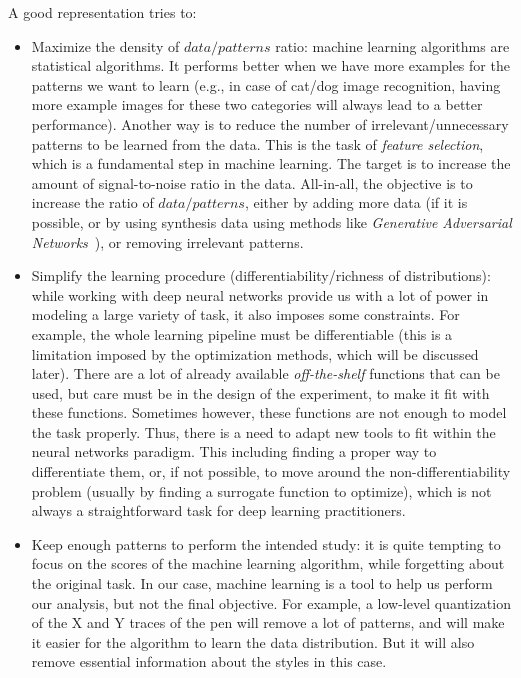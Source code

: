   A good representation tries to:
  \begin{itemize}[noitemsep]
      \item Maximize the density of $data/patterns$ ratio: machine learning algorithms are statistical algorithms. It performs better when we have more examples for the patterns we want to learn (e.g., in case of cat/dog image recognition, having more example images for these two categories will always lead to a better performance).
      Another way is to reduce the number of irrelevant/unnecessary patterns to be learned from the data. This is the task of \textit{feature selection}, which is a fundamental step in machine learning. The target is to increase the amount of signal-to-noise ratio in the data.
      All-in-all, the objective is to increase the ratio of $data/patterns$, either by adding more data (if it is possible, or by using synthesis data using methods like \textit{Generative Adversarial Networks}~\citep{goodfellow2014generative}), or removing irrelevant patterns.
      \item Simplify the learning procedure (differentiability/richness of distributions): while working with deep neural networks provide us with a lot of power in modeling a large variety of task, it also imposes some constraints.
      For example, the whole learning pipeline must be differentiable (this is a limitation imposed by the optimization methods, which will be discussed later). There are a lot of already available \textit{off-the-shelf} functions that can be used, but care must be in the design of the experiment, to make it fit with these functions.
      Sometimes however, these functions are not enough to model the task properly. Thus, there is a need to adapt new tools to fit within the neural networks paradigm. This including finding a proper way to differentiate them, or, if not possible, to move around the non-differentiability problem (usually by finding a surrogate function to optimize), which is not always a straightforward task for deep learning practitioners.
      \item Keep enough patterns to perform the intended study: it is quite tempting to focus on the scores of the machine learning algorithm, while forgetting about the original task. In our case, machine learning is a tool to help us perform our analysis, but not the final objective. For example, a low-level quantization of the X and Y traces of the pen will remove a lot of patterns, and will make it easier for the algorithm to learn the data distribution. But it will also remove essential information about the styles in this case.
  \end{itemize}

